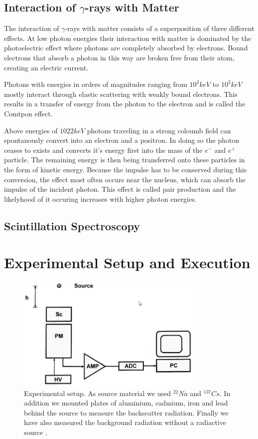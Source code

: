 \documentclass[bigchapter,colorback,accentcolor=tud4b,linedtoc,11pt]{tudreport}
\begin{document}
\section{Interaction of $\gamma$-rays with Matter}
The interaction of $\gamma$-rays with matter consists of a superposition
of three different effects. At low photon energies their interaction with matter
is dominated by the photoelectric effect where photons are completely absorbed
by electrons. Bound electrons that absorb a photon in this way are broken free
from their atom, creating an electric current.

Photons with energies in orders of magnitudes ranging from $10^2 keV$ to $10^3 keV$
mostly interact through elastic scattering with weakly bound electrons. This
results in a transfer of energy from the photon to the electron and is called
the Comtpon effect.

Above energies of $1022keV$ photons traveling in a strong coloumb field can
spontanously convert into an electron and a positron. In doing so the photon
ceases to exists and converts it's energy first into the mass of the $e^-$ and
$e^+$ particle. The remaining energy is then being transferred onto these
particles in the form of kinetic energy. Because the impulse has to be conserved
during this conversion, the effect most often occurs near the nucleus, which can
absorb the impulse of the incident photon. This effect is called pair production
and the likelyhood of it occuring increases with higher photon energies.



\section{Scintillation Spectroscopy}


\chapter{Experimental Setup and Execution}
\begin{figure}[H] 
  \centering
     \includegraphics[width=0.8\textwidth]{img/aufbau.png}
     \caption{Experimental setup. As source material we used $^{22}Na$ and
       $^{137}Cs$. In addition we mounted plates of aluminium, cadmium, iron and
     lead behind the source to measure the backscatter radiation. Finally we have
     also measured the background radiation without a radiactive source \cite{Anleitung}.}
  \label{fig:aufbau}
\end{figure}
\end{document}
